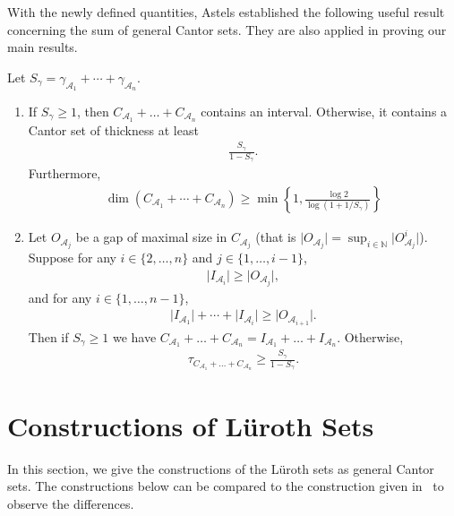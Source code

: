 \documentclass{ws-ijnt}
\begin{document}
	With the newly defined quantities, Astels established the following useful result concerning the sum of general Cantor sets. They are also applied in proving our main results. 
	\begin{proposition}\label{prop: astels}
		Let $S_{\gamma} = \gamma_{\mathcal{A}_1}+\cdots+\gamma_{\mathcal{A}_n}$. 
		\begin{enumerate}
			\item If $S_{\gamma} \geq 1$, then $C_{\mathcal{A}_1}+\dots+C_{\mathcal{A}_n}$ contains an interval. Otherwise, it contains a Cantor set of thickness at least 
			\begin{align*}
				\frac{S_{\gamma}}{1-S_{\gamma}}.
			\end{align*}
			Furthermore,
			\begin{align*}
				\dim{(C_{\mathcal{A}_1}+\cdots+C_{\mathcal{A}_n})}
				\geq \min{\left\{1,\frac{\log{2}}{\log\left(1+1/S_{\gamma}\right)}\right\}}
			\end{align*}
			\item Let $O_{\mathcal{A}_j}$ be a gap of maximal size in $C_{\mathcal{A}_j}$ (that is $\lvert O_{\mathcal{A}_j}\rvert=\sup_{i\in\mathbb{N}}{\lvert O_{\mathcal{A}_j}^i\rvert}$). Suppose for any $i\in\{2,\dots, n\}$ and $j\in\{1,\dots, i-1\}$,
			\begin{align}
				\label{eq: (12)}
				\lvert I_{\mathcal{A}_i} \rvert \geq \lvert O_{\mathcal{A}_j} \rvert,
			\end{align}
			and for any $i\in\{1,\dots, n-1\}$, 
			\begin{align}
				\label{eq: (13)}        
				\lvert I_{\mathcal{A}_1} \rvert+\cdots+\lvert I_{\mathcal{A}_i} \rvert
				\geq \lvert O_{\mathcal{A}_{i+1}} \rvert.
			\end{align}
			Then if $S_{\gamma} \geq 1$ we have $C_{\mathcal{A}_1}+\dots+C_{\mathcal{A}_n} = I_{\mathcal{A}_1}+\dots+I_{\mathcal{A}_n}$. Otherwise,
			\begin{align*}
				\tau_{C_{\mathcal{A}_1}+\dots+C_{\mathcal{A}_n}} \geq \frac{S_{\gamma}}{1-S_{\gamma}}.
			\end{align*}
		\end{enumerate}
	\end{proposition}
	
	\section{Constructions of L\"uroth Sets}\label{sect: Constructions}
	In this section, we give the constructions of the L\"uroth sets as general Cantor sets. The constructions below can be compared to the construction given in~\cite{lee2024explicitupperboundsdecay} to observe the differences.
	
\end{document}
